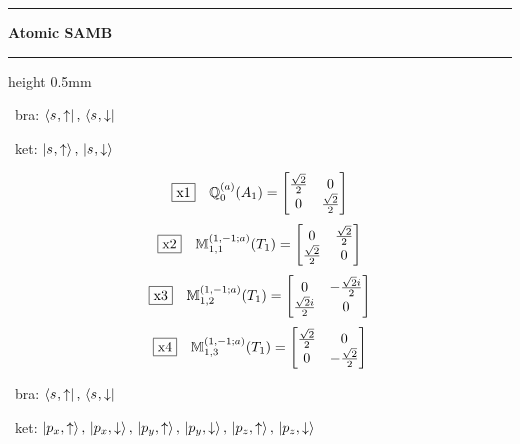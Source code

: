 \documentclass[fleqn,10pt,landscape]{jsarticle}
\begin{document}
\vspace{5mm}
\noindent \rule[0.5mm]{5mm}{0.5mm}\hspace{3mm}\textbf{Atomic SAMB}\hspace{3mm}\leaders\hrule height 0.5mm\hfill\kern0pt
\vspace{3mm}

\vspace{5mm}

\noindent\textbullet\, bra: $\bra{s_{},\uparrow},\, \bra{s_{},\downarrow}$

\noindent\textbullet\, ket: $\ket{s_{},\uparrow},\, \ket{s_{},\downarrow}$

\begin{dmath*}
\fbox{x1}\quad \mathbb{Q}_{0}^{(a)}(A_{1})=\begin{bmatrix} \frac{\sqrt{2}}{2} & 0 \\ 0 & \frac{\sqrt{2}}{2} \end{bmatrix}
\end{dmath*}
\begin{dmath*}
\fbox{x2}\quad \mathbb{M}_{1,1}^{(1,-1;a)}(T_{1})=\begin{bmatrix} 0 & \frac{\sqrt{2}}{2} \\ \frac{\sqrt{2}}{2} & 0 \end{bmatrix}
\end{dmath*}
\begin{dmath*}
\fbox{x3}\quad \mathbb{M}_{1,2}^{(1,-1;a)}(T_{1})=\begin{bmatrix} 0 & - \frac{\sqrt{2} i}{2} \\ \frac{\sqrt{2} i}{2} & 0 \end{bmatrix}
\end{dmath*}
\begin{dmath*}
\fbox{x4}\quad \mathbb{M}_{1,3}^{(1,-1;a)}(T_{1})=\begin{bmatrix} \frac{\sqrt{2}}{2} & 0 \\ 0 & - \frac{\sqrt{2}}{2} \end{bmatrix}
\end{dmath*}
\vspace{5mm}

\noindent\textbullet\, bra: $\bra{s_{},\uparrow},\, \bra{s_{},\downarrow}$

\noindent\textbullet\, ket: $\ket{p_{x},\uparrow},\, \ket{p_{x},\downarrow},\, \ket{p_{y},\uparrow},\, \ket{p_{y},\downarrow},\, \ket{p_{z},\uparrow},\, \ket{p_{z},\downarrow}$
\end{document}
